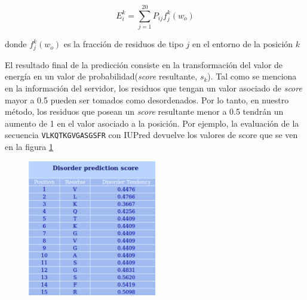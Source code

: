 \begin{equation}\label{modelofinal}
E_i^k = \sum_{j=1}^{20} P_{ij}f_{j}^k(w_o) 
\end{equation}

donde $f_{j}^k(w_o)$ es la fracción de residuos de tipo $j$ en el entorno de la posición $k$


El resultado final de la predicción consiste en la transformación del valor de energía en un valor de probabilidad(\textit{score} resultante, $s_k$).
Tal como se menciona en la información del servidor\cite{dosztanyi2005iupred}, los residuos que tengan un valor asociado de \textit{score} mayor a 0.5 pueden ser tomados como desordenados.
Por lo tanto, en nuestro método, los residuos que posean un \textit{score} resultante menor a 0.5 tendrán un aumento de 1 en el valor asociado a la posición.
Por ejemplo, la evaluación de la secuencia \texttt{VLKQTKGVGASGSFR} con IUPred devuelve los valores de score que se ven en la figura \ref{iupredResults}

\begin{figure}[h!]
\centering
\includegraphics[width=0.5\textwidth]{img/iupredTabla.png} 
\caption{}
\label{iupredResults}
\end{figure}

% 
% 


